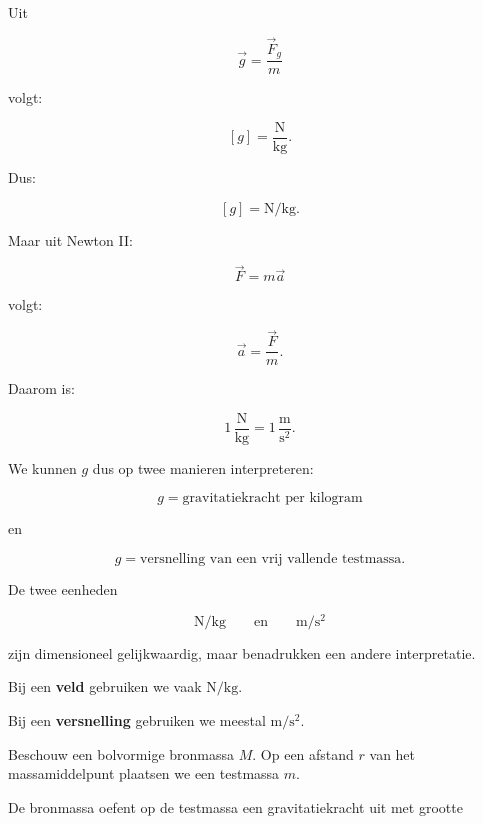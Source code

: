 \documentclass{ximera}
\begin{document}


Uit

\[
\vec g
=
\frac{\vec F_g}{m}
\]

volgt:

\[
[g]
=
\mathrm{\frac{N}{kg}}.
\]

Dus:

\[
\boxed{
[g]=\mathrm{N/kg}.
}
\]


Maar uit Newton II:

\[
\vec F=m\vec a
\]

volgt:

\[
\vec a=\frac{\vec F}{m}.
\]

Daarom is:

\[
1\,\mathrm{\frac{N}{kg}}
=
1\,\mathrm{\frac{m}{s^2}}.
\]

We kunnen $g$ dus op twee manieren interpreteren:

\[
\boxed{
g=\text{gravitatiekracht per kilogram}
}
\]

en

\[
\boxed{
g=\text{versnelling van een vrij vallende testmassa}.
}
\]


\begin{opmerking}

De twee eenheden

\[
\mathrm{N/kg}
\qquad\text{en}\qquad
\mathrm{m/s^2}
\]

zijn dimensioneel gelijkwaardig, maar benadrukken een andere
interpretatie.

Bij een \textbf{veld} gebruiken we vaak $\mathrm{N/kg}$.

Bij een \textbf{versnelling} gebruiken we meestal $\mathrm{m/s^2}$.

\end{opmerking}




Beschouw een bolvormige bronmassa $M$. Op een afstand $r$ van het
massamiddelpunt plaatsen we een testmassa $m$.

De bronmassa oefent op de testmassa een gravitatiekracht uit met
grootte
\end{document}
